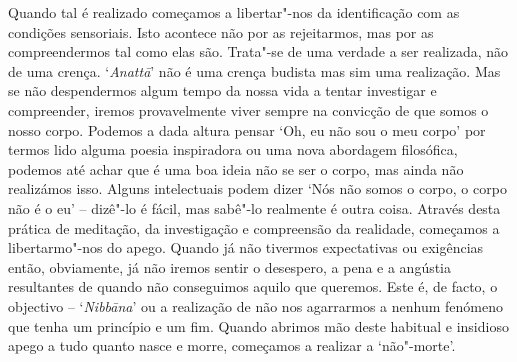 Quando tal é realizado começamos a libertar"-nos da identificação com as
condições sensoriais. Isto acontece não por as rejeitarmos, mas por as
compreendermos tal como elas são. Trata"-se de uma verdade a ser
realizada, não de uma crença. `\emph{Anattā}' não é uma crença budista
mas sim uma realização. Mas se não despendermos algum tempo da nossa
vida a tentar investigar e compreender, iremos provavelmente viver
sempre na convicção de que somos o nosso corpo. Podemos a dada altura
pensar `Oh, eu não sou o meu corpo' por termos lido alguma poesia
inspiradora ou uma nova abordagem filosófica, podemos até achar que é
uma boa ideia não se ser o corpo, mas ainda não realizámos isso. Alguns
intelectuais podem dizer `Nós não somos o corpo, o corpo não é o eu' --
dizê"-lo é fácil, mas sabê"-lo realmente é outra coisa. Através desta
prática de meditação, da investigação e compreensão da realidade,
começamos a libertarmo"-nos do apego. Quando já não tivermos expectativas
ou exigências então, obviamente, já não iremos sentir o desespero, a
pena e a angústia resultantes de quando não conseguimos aquilo que
queremos. Este é, de facto, o objectivo
-- `\emph{Nibbāna}' ou a realização de não nos agarrarmos a nenhum
fenómeno que tenha um princípio e um fim. Quando abrimos mão deste
habitual e insidioso apego a tudo quanto nasce e morre, começamos a
realizar a `não"-morte'.

